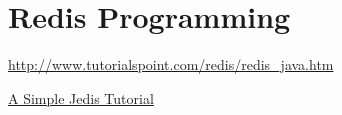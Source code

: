 \section{Redis Programming}

\url{http://www.tutorialspoint.com/redis/redis_java.htm}

\href{http://www.tutorialspoint.com/redis/redis_java.htm}{A Simple Jedis
Tutorial}
